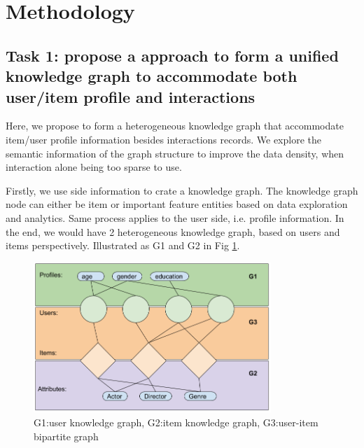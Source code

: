 


\section{Methodology}

\subsection*{Task 1: propose a approach to form a unified knowledge graph to accommodate both user/item profile and interactions}

Here, we propose to form a heterogeneous knowledge graph that accommodate item/user profile information besides interactions records. We explore the semantic information of the graph structure to improve the data density, when interaction alone being too sparse to use. 

Firstly, we use side information to crate a knowledge graph. The knowledge graph node can either be item or important feature entities based on data exploration and analytics. Same process applies to the user side, i.e. profile information. In the end, we would have 2 heterogeneous knowledge graph, based on users and items perspectively. Illustrated as G1 and G2 in Fig \ref{fig:ikgraph}.

\begin{figure}[!t]
    \centering
    \includegraphics[width=0.8\textwidth]{figs/ikdiagram.png}
    \caption{G1:user knowledge graph, G2:item knowledge graph, G3:user-item bipartite graph}\label{fig:ikgraph}
\end{figure}

